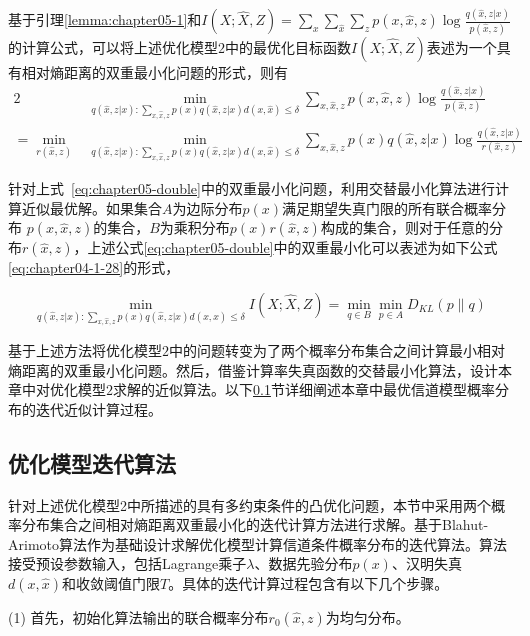 基于引理\ref{lemma:chapter05-1}和$I(X;\hat{X},Z)=\sum_{x}\sum_{\hat{x}}\sum_{z}p(x,\hat{x},z)\log \frac{q(\hat{x},z|x)}{p(\hat{x},z)}$的计算公式，可以将上述优化模型$2$中的最优化目标函数$I(X;\hat{X},Z)$表述为一个具有相对熵距离的双重最小化问题的形式，则有
\begin{alignat}{2}
& \min_{q(\hat{x},z|x):\sum_{x,\hat{x},z}p(x)q(\hat{x},z|x)d(x,\hat{x})\leq  \delta}\sum_{x,\hat{x},z} p(x,\hat{x},z)\log \frac{q(\hat{x},z|x)}{p(\hat{x},z)}\\
=\min_{r(\hat{x},z)}&\min_{q(\hat{x},z|x):\sum_{x,\hat{x},z}p(x)q(\hat{x},z|x)d(x,\hat{x})\leq  \delta}\sum_{x,\hat{x},z}p(x)q(\hat{x},z|x)\log \frac{q(\hat{x},z|x)}{r(\hat{x},z)}\label{eq:chapter05-double}
\end{alignat}

针对上式~\ref{eq:chapter05-double}中的双重最小化问题，利用交替最小化算法进行计算近似最优解。如果集合$A$为边际分布$p(x)$满足期望失真门限的所有联合概率分布 $p(x,\hat{x},z)$的集合，$B$为乘积分布$p(x)r(\hat{x},z)$构成的集合，则对于任意的分布$r(\hat{x},z)$，上述公式\ref{eq:chapter05-double}中的双重最小化可以表述为如下公式\ref{eq:chapter04-1-28}的形式，

\begin{equation}\label{eq:chapter04-1-28}
	\min_{q(\hat{x},z|x):\sum_{x,\hat{x},z}p(x)q(\hat{x},z|x)d(x,\hat{x})\leq  \delta } I(X;\hat{X},Z)=\min_{q \in B}\min_{p \in A} D_{KL}(p\parallel q)
\end{equation}

基于上述方法将优化模型$2$中的问题转变为了两个概率分布集合之间计算最小相对熵距离的双重最小化问题。然后，借鉴计算率失真函数的交替最小化算法\cite{csiszar1984information,csiszar1974on}，设计本章中对优化模型$2$求解的近似算法。以下\ref{sec:chapter04-algorithm}节详细阐述本章中最优信道模型概率分布的迭代近似计算过程。

\subsection{优化模型迭代算法}\label{sec:chapter04-algorithm}

针对上述优化模型2中所描述的具有多约束条件的凸优化问题，本节中采用两个概率分布集合之间相对熵距离双重最小化的迭代计算方法进行求解。基于Blahut-Arimoto算法作为基础设计求解优化模型计算信道条件概率分布的迭代算法。算法接受预设参数输入，包括Lagrange乘子$\lambda$、数据先验分布$p(x)$、汉明失真$d(x,\hat{x})$和收敛阈值门限$T$。具体的迭代计算过程包含有以下几个步骤。

(1) 首先，初始化算法输出的联合概率分布$r_0(\hat{x},z)$为均匀分布。

